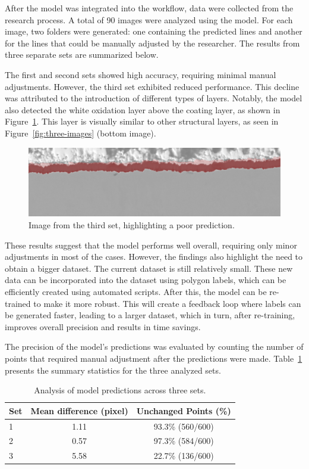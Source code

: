 After the model was integrated into the workflow, data were collected from the research process. A total of 90 images were analyzed using the model. For each image, two folders were generated: one containing the predicted lines and another for the lines that could be manually adjusted by the researcher. The results from three separate sets are summarized below.

The first and second sets showed high accuracy, requiring minimal manual adjustments. However, the third set exhibited reduced performance. This decline was attributed to the introduction of different types of layers. Notably, the model also detected the white oxidation layer above the coating layer, as shown in Figure~\ref{fig:ox}. This layer is visually similar to other structural layers, as seen in Figure~\ref{fig:three-images} (bottom image).

\begin{figure}[H]
    \centering
    \includegraphics[width=0.8\linewidth]{PICTURES/wrongPred.png}
    \caption{Image from the third set, highlighting a poor prediction.}
    \label{fig:ox}
\end{figure}

These results suggest that the model performs well overall, requiring only minor adjustments in most of the cases. However, the findings also highlight the need to obtain a bigger dataset. The current dataset is still relatively small. These new data can be incorporated into the dataset using polygon labels, which can be efficiently created using automated scripts. After this, the model can be re-trained to make it more robust. This will create a feedback loop where labels can be generated faster, leading to a larger dataset, which in turn, after re-training, improves overall precision and results in time savings.

The precision of the model's predictions was evaluated by counting the number of points that required manual adjustment after the predictions were made. Table~\ref{tab:results} presents the summary statistics for the three analyzed sets.

\begin{table}[H]
    \centering
    \caption{Analysis of model predictions across three sets.}

    \begin{tabular}{lcc}
        \toprule
        \textbf{Set} & \textbf{Mean difference (pixel)}  & \textbf{Unchanged Points (\%)} \\
        \midrule
        1 & 1.11  & 93.3\% (560/600) \\
        2 & 0.57  & 97.3\% (584/600) \\
        3 & 5.58  & 22.7\% (136/600) \\
        \bottomrule
    \end{tabular}
    \label{tab:results}

\end{table}

